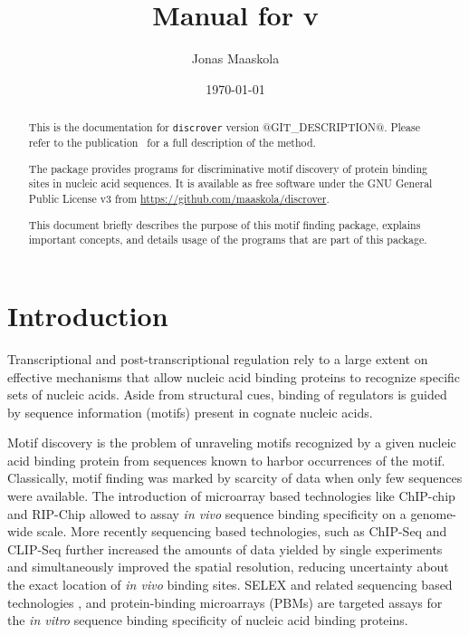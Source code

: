 \documentclass[a4paper]{article}
\title{Manual for \discrover{} v\version{}}
\author{Jonas Maaskola}
\date{\today}
\makeatletter
\newcommand{\discrover}[0]{\texttt{discrover}}
\newcommand{\version}[0]{@GIT_DESCRIPTION@}
\newcommand{\theurl}[0]{\url{https://github.com/maaskola/discrover}}
\makeatother
\begin{document}
\maketitle

\begin{abstract}
  This is the documentation for \discrover{} version \version{}.
  Please refer to the publication~\cite{Maaskola2014} for a full description of the method.

  The package provides programs for discriminative motif discovery of protein binding sites in nucleic acid sequences.
  It is available as free software under the GNU General Public License v3 from \theurl{}.

  This document briefly describes the purpose of this motif finding package, explains important concepts, and details usage of the programs that are part of this package.
\end{abstract}

\tableofcontents

\section{Introduction}

Transcriptional and post-transcriptional regulation rely to a large extent on effective mechanisms that allow nucleic acid binding proteins to recognize specific sets of nucleic acids.
Aside from structural cues, binding of regulators is guided by sequence information (motifs) present in cognate nucleic acids.

Motif discovery is the problem of unraveling motifs recognized by a given nucleic acid binding protein from sequences known to harbor occurrences of the motif.
Classically, motif finding was marked by scarcity of data when only few sequences were available.
The introduction of microarray based technologies like ChIP-chip \cite{Ren2000,Iyer2001} and RIP-Chip \cite{Tenenbaum2000,Keene2006} allowed to assay \textit{in vivo} sequence binding specificity on a genome-wide scale.
More recently sequencing based technologies, such as ChIP-Seq \cite{Robertson2007, Johnson2007} and CLIP-Seq \cite{Licatalosi2008,Sanford2009,Hafner2010} further increased the amounts of data yielded by single experiments and simultaneously improved the spatial resolution, reducing uncertainty about the exact location of \textit{in vivo} binding sites.
SELEX \cite{Ellington1990,Tuerk1990} and related sequencing based technologies \cite{Jolma2010}, and protein-binding microarrays (PBMs) \cite{Bulyk2001,Berger2006a} are targeted assays for the \textit{in vitro} sequence binding specificity of nucleic acid binding proteins.
\end{document}
